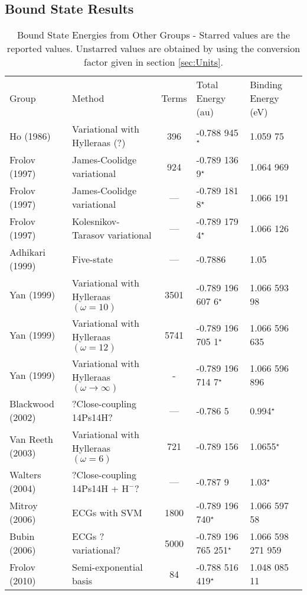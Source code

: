 \documentclass[preprint,showpacs,preprintnumbers,amsmath,amssymb]{revtex4}
\begin{document}
\subsection{Bound State Results}
\begin{table}[H]
\begin{center}
\begin{tabular}{l l c l l}
\toprule
Group & Method & Terms & Total Energy (au) & Binding Energy (eV)\\

Ho (1986) \cite{Ho1986} & Variational with Hylleraas (?) & 396 & -0.788 945$^\star$ & 1.059 75 \\
Frolov (1997) \cite{Frolov1997a} & James-Coolidge variational & 924 & -0.789 136 9$^\star$ & 1.064 969 \\
Frolov (1997) \cite{Frolov1997a} & James-Coolidge variational & --- & -0.789 181 8$^\star$ & 1.066 191 \\
Frolov (1997) \cite{Frolov1997b} & Kolesnikov-Tarasov variational & --- & -0.789 179 4$^\star$ & 1.066 126 \\
Adhikari (1999) \cite{Adhikari1999} & Five-state & --- & -0.7886 & 1.05 \\
Yan (1999) \cite{Yan1999} & Variational with Hylleraas $(\omega = 10)$ & 3501 & -0.789 196 607 6$^\star$ & 1.066 593 98 \\
Yan (1999) \cite{Yan1999} & Variational with Hylleraas $(\omega = 12)$ & 5741 & -0.789 196 705 1$^\star$ & 1.066 596 635 \\
Yan (1999) \cite{Yan1999} & Variational with Hylleraas $(\omega \rightarrow \infty)$ & - & -0.789 196 714 7$^\star$ & 1.066 596 896 \\
Blackwood (2002) \cite{Blackwood2002} & ?Close-coupling 14Ps14H? & --- & -0.786 5 & 0.994$^\star$ \\
Van Reeth (2003) \cite{VanReeth2003} & Variational with Hylleraas $(\omega = 6)$ & 721 & -0.789 156 & 1.0655$^\star$ \\
Walters (2004) \cite{Walters2004} & ?Close-coupling 14Ps14H + $\text{H}^-$? & --- & -0.787 9 & 1.03$^\star$\\
Mitroy (2006) \cite{Mitroy2006} & ECGs with SVM & 1800 & -0.789 196 740$^\star$ & 1.066 597 58 \\
Bubin (2006) \cite{Bubin2006} & ECGs ?variational? & 5000 & -0.789 196 765 251$^\star$ & 1.066 598 271 959 \\
Frolov (2010) \cite{Frolov2010} & Semi-exponential basis & 84 & -0.788 516 419$^\star$ & 1.048 085 11 \\

\end{tabular}
\caption{Bound State Energies from Other Groups - Starred values are the reported values.  Unstarred values are obtained by using the conversion factor given in section \ref{sec:Units}.}
\label{tab:BoundEnergyOther}
\end{center}
\end{table}
\end{document}
